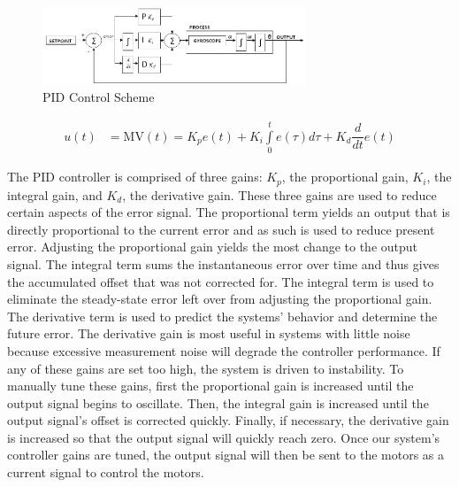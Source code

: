 \documentclass[11pt]{report}
\begin{document}
\begin{spacing}{1.5}
\begin{figure}[H]
    \centering
    \includegraphics[width=0.7\textwidth]{PIDControlScheme}
    \caption{PID Control Scheme}
    \label{PIDControlScheme}
\end{figure}

\begin{align}
    u(t) &= \text{MV}(t) = K_p e(t) + K_i \int\limits_0^t e(\tau) d\tau + K_d \dfrac{d}{dt} e(t) \label{PIDControlEquation}
\end{align}

The PID controller is comprised of three gains: $K_p$, the proportional gain, $K_i$, the integral gain, and $K_d$, the derivative gain.  These three gains are used to reduce certain aspects of the error signal.  The proportional term yields an output that is directly proportional to the current error and as such is used to reduce present error.  Adjusting the proportional gain yields the most change to the output signal.  The integral term sums the instantaneous error over time and thus gives the accumulated offset that was not corrected for.  The integral term is used to eliminate the steady-state error left over from adjusting the proportional gain. The derivative term is used to predict the systems’ behavior and determine the future error.  The derivative gain is most useful in systems with little noise because excessive measurement noise will degrade the controller performance.   If any of these gains are set too high, the system is driven to instability.  To manually tune these gains, first the proportional gain is increased until the output signal begins to oscillate.  Then, the integral gain is increased until the output signal’s offset is corrected quickly.  Finally, if necessary, the derivative gain is increased so that the output signal will quickly reach zero.  Once our system’s controller gains are tuned, the output signal will then be sent to the motors as a current signal to control the motors.          
                                                                                                                                                                                                                                                                                                                                                                                                                                                                                               

\end{spacing}
\end{document}
